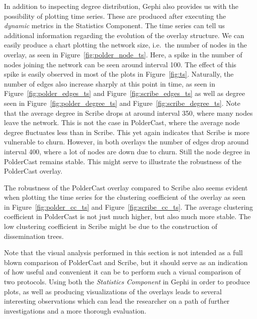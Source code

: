 In addition to inspecting degree distribution, Gephi also provides us
with the possibility of plotting time series. These are produced after
executing the \emph{dynamic} metrics in the Statistics Component.  The
time series can tell us additional information regarding the evolution
of the overlay structure. We can easily produce a chart plotting the
network size, i.e.\ the number of nodes in the overlay, as seen in
Figure~\ref{fig:polder_node_ts}.  Here, a spike in the number of nodes
joining the network can be seen around interval 100. The effect of this
spike is easily observed in most of the plots in Figure~\ref{fig:ts}.
Naturally, the number of edges also increase sharply at this point in
time, as seen in Figure~\ref{fig:polder_edges_ts} and
Figure~\ref{fig:scribe_edges_ts} as well as degree seen in
Figure~\ref{fig:polder_degree_ts} and Figure~\ref{fig:scribe_degree_ts}.
Note that the average degree in Scribe drops at around interval 350,
where many nodes leave the network. This is not the case in PolderCast,
where the average node degree fluctuates less than in Scribe. This yet
again indicates that Scribe is more vulnerable to churn. However, in
both overlays the number of edges drop around interval 400, where a lot
of nodes are down due to churn. Still the node degree in PolderCast
remains stable. This might serve to illustrate the robustness of the PolderCast overlay.

The robustness of the PolderCast overlay compared to Scribe also seems
evident when plotting the time series for the clustering coefficient of
the overlay as seen in Figure~\ref{fig:polder_cc_ts} and
Figure~\ref{fig:scribe_cc_ts}. The average clustering coefficient in
PolderCast is not just much higher, but also much more stable. The low
clustering coefficient in Scribe might be due to the construction of
dissemination trees.

Note that the visual analysis performed in this section is not intended as a
full blown comparison of PolderCast and Scribe, but it should serve as
an indication of how useful and convenient it can be to perform such a
visual comparison of two protocols. Using both the \emph{Statistics
    Component} in Gephi in order to produce plots, as well as producing
visualizations of the overlays leads to several interesting observations
which can lead the researcher on a path of further investigations and a
more thorough evaluation.

